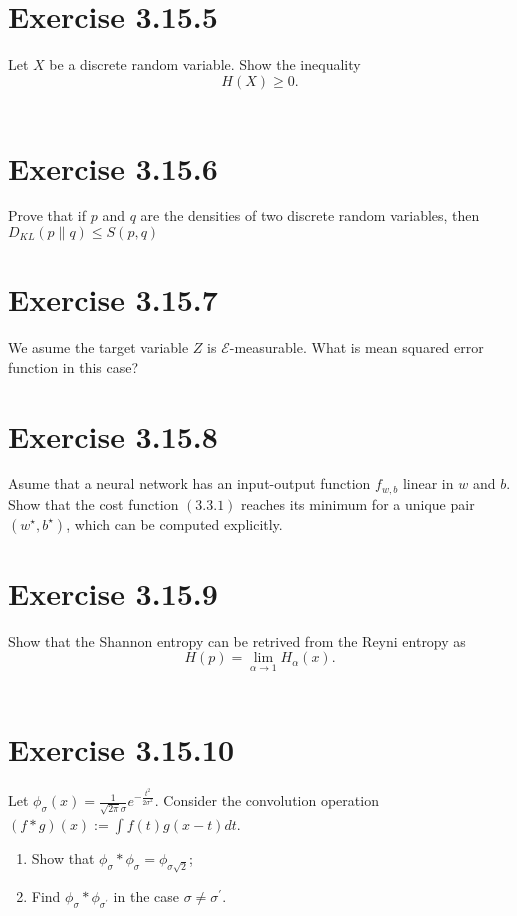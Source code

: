 \documentclass{exam}
\begin{document}
\section*{Exercise 3.15.5}
Let $X$ be a discrete random variable. Show the inequality\\
\begin{equation*}
    H(X) \geq 0.
\end{equation*}\\

\section*{Exercise 3.15.6}
Prove that if $p$ and $q$ are the densities of two discrete random variables, then $D_{KL}(p \lVert q ) \leq S(p,q)$

\section*{Exercise 3.15.7}
We asume the target variable $Z$ is $\mathcal{E}$-measurable. What is mean squared error function in this case?

\section*{Exercise 3.15.8}
Asume that a neural network has an input-output function $f_{w,b}$ linear in $w$ and $b$. Show that the cost function $(3.3.1)$ reaches its minimum for a 
unique pair $(w^{\star},b^{\star})$, which can be computed explicitly. 

\section*{Exercise 3.15.9}
Show that the Shannon entropy can be retrived from the Reyni entropy as\\
\begin{equation*}
    H(p) = \lim_{\alpha \to 1} H_{\alpha}(x).
\end{equation*}\\

\section*{Exercise 3.15.10}
Let $\phi_\sigma(x) = \displaystyle \frac{1}{\sqrt{2\pi}\sigma}e^{-\frac{t^2}{2\sigma^2}}$. Consider the convolution 
operation $(f \ast g)(x) :=  \displaystyle\int f(t) g(x - t) dt $.
\begin{enumerate}
    \item Show that $\phi_{\sigma} \ast \phi_{\sigma} = \phi_{\sigma\sqrt{2}}$;
    \item Find $\phi_{\sigma} \ast \phi_{\sigma^{\prime}}$ in the case $\sigma \neq \sigma^{\prime}$.
\end{enumerate}
\end{document}
